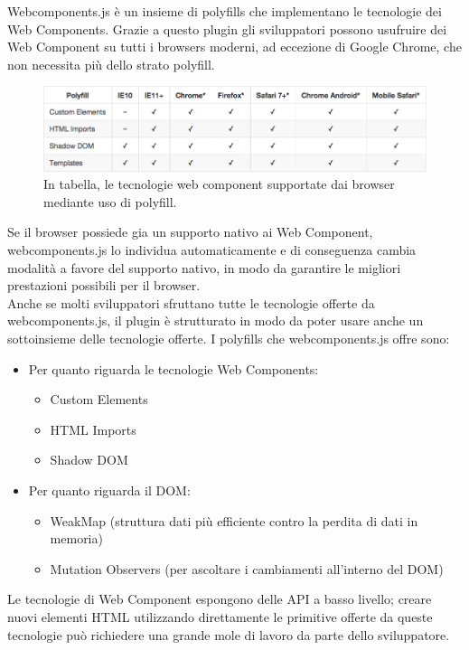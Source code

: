 Webcomponents.js è un insieme di polyfills che implementano le tecnologie dei Web Components. Grazie a questo plugin gli sviluppatori possono usufruire dei Web Component su tutti i browsers moderni, ad eccezione di Google Chrome, che non necessita più dello strato polyfill.
\\
\begin{figure}[htb]
 \centering
 \includegraphics[width=1\linewidth]{images/chapter_tecnologie_abilitanti/tecnologie_abilitanti_polyfill.png}\hfill
 \caption[Supporto ai polyfill]{In tabella, le tecnologie web component supportate dai browser mediante uso di polyfill.}
 \label{fig:tecnologie_abilitanti_polyfill}
\end{figure}
Se il browser possiede gia un supporto nativo ai Web Component, webcomponents.js lo individua automaticamente e di conseguenza cambia modalità a favore del supporto nativo, in modo da garantire le migliori prestazioni possibili per il browser.
\\
Anche se molti sviluppatori sfruttano tutte le tecnologie offerte da webcomponents.js, il plugin è strutturato in modo da poter usare anche un sottoinsieme delle tecnologie offerte. 
I polyfills che webcomponents.js offre sono:
\begin{itemize}
\item Per quanto riguarda le tecnologie Web Components:
\begin{itemize} 
\item Custom Elements
\item HTML Imports
\item Shadow DOM
\end{itemize}
\item Per quanto riguarda il DOM:
\begin{itemize}
\item WeakMap (struttura dati più efficiente contro la perdita di dati in memoria)
\item Mutation Observers (per ascoltare i cambiamenti all’interno del DOM)
\end{itemize}
\end{itemize}
Le tecnologie di Web Component espongono delle API a basso livello; creare nuovi elementi HTML utilizzando direttamente le primitive offerte da queste tecnologie può richiedere una grande mole di lavoro da parte dello sviluppatore. 
